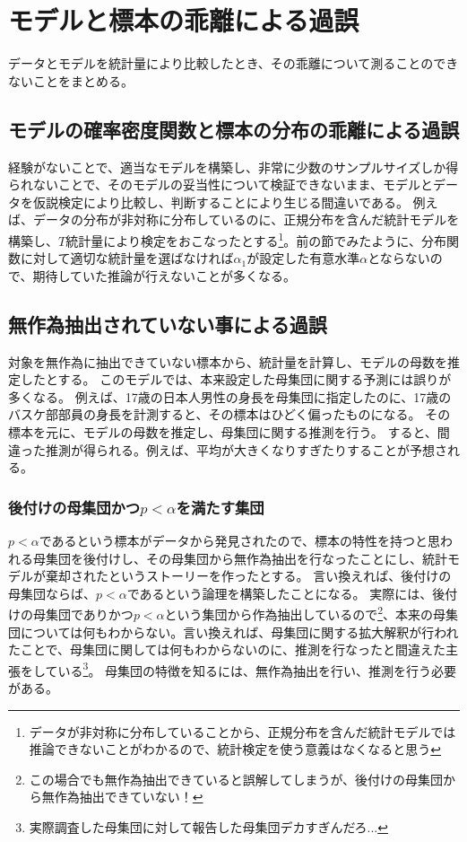
\section{モデルと標本の乖離による過誤}
データとモデルを統計量により比較したとき、その乖離について測ることのできないことをまとめる。

\subsection{モデルの確率密度関数と標本の分布の乖離による過誤}
経験がないことで、適当なモデルを構築し、非常に少数のサンプルサイズしか得られないことで、そのモデルの妥当性について検証できないまま、モデルとデータを仮説検定により比較し、判断することにより生じる間違いである。
例えば、データの分布が非対称に分布しているのに、正規分布を含んだ統計モデルを構築し、$T$統計量により検定をおこなったとする\footnote{データが非対称に分布していることから、正規分布を含んだ統計モデルでは推論できないことがわかるので、統計検定を使う意義はなくなると思う}。前の節でみたように、分布関数に対して適切な統計量を選ばなければ$\alpha_1$が設定した有意水準$\alpha$とならないので、期待していた推論が行えないことが多くなる。

\subsection{無作為抽出されていない事による過誤}
対象を無作為に抽出できていない標本から、統計量を計算し、モデルの母数を推定したとする。
このモデルでは、本来設定した母集団に関する予測には誤りが多くなる。
例えば、17歳の日本人男性の身長を母集団に指定したのに、17歳のバスケ部部員の身長を計測すると、その標本はひどく偏ったものになる。
その標本を元に、モデルの母数を推定し、母集団に関する推測を行う。
すると、間違った推測が得られる。例えば、平均が大きくなりすぎたりすることが予想される。


\subsubsection{後付けの母集団かつ$p<\alpha$を満たす集団}
$p<\alpha$であるという標本がデータから発見されたので、標本の特性を持つと思われる母集団を後付けし、その母集団から無作為抽出を行なったことにし、統計モデルが棄却されたというストーリーを作ったとする。
言い換えれば、後付けの母集団ならば、$p<\alpha$であるという論理を構築したことになる。
実際には、後付けの母集団でありかつ$p<\alpha$という集団から作為抽出しているので\footnote{この場合でも無作為抽出できていると誤解してしまうが、後付けの母集団から無作為抽出できていない！}、本来の母集団については何もわからない。言い換えれば、母集団に関する拡大解釈が行われたことで、母集団に関しては何もわからないのに、推測を行なったと間違えた主張をしている\footnote{実際調査した母集団に対して報告した母集団デカすぎんだろ...}。
母集団の特徴を知るには、無作為抽出を行い、推測を行う必要がある。

